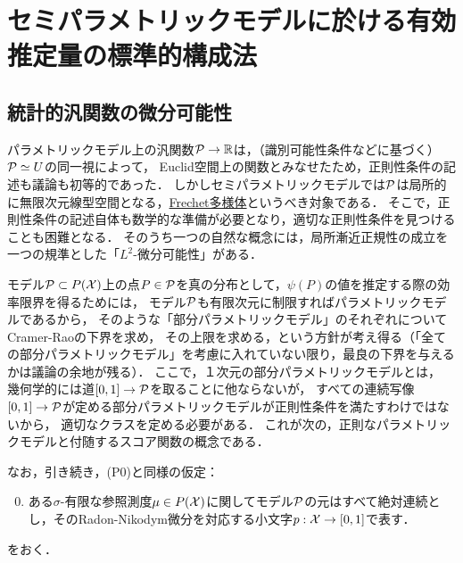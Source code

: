 \documentclass[uplatex, dvipdfmx]{jsarticle}
\begin{document}
\section{セミパラメトリックモデルに於ける有効推定量の標準的構成法}

\subsection{統計的汎関数の微分可能性}

\begin{tcolorbox}[colframe=ForestGreen, colback=ForestGreen!10!white,breakable,colbacktitle=ForestGreen!40!white,coltitle=black,fonttitle=\bfseries\sffamily,
title=]
    パラメトリックモデル上の汎関数$\P\to\R$は，（識別可能性条件などに基づく）$\P\simeq U$の同一視によって，
    Euclid空間上の関数とみなせたため，正則性条件の記述も議論も初等的であった．
    しかしセミパラメトリックモデルでは$\P$は局所的に無限次元線型空間となる，\href{https://ncatlab.org/nlab/show/Fr%C3%A9chet+manifold}{Frechet多様体}というべき対象である．
    そこで，正則性条件の記述自体も数学的な準備が必要となり，適切な正則性条件を見つけることも困難となる．
    そのうち一つの自然な概念には，局所漸近正規性の成立を一つの規準とした「$L^2$-微分可能性」がある．
\end{tcolorbox}

モデル$\P\subset P(\X)$上の点$P\in\P$を真の分布として，$\psi(P)$の値を推定する際の効率限界を得るためには，
モデル$\P$も有限次元に制限すればパラメトリックモデルであるから，
そのような「部分パラメトリックモデル」のそれぞれについてCramer-Raoの下界を求め，
その上限を求める，という方針が考え得る（「全ての部分パラメトリックモデル」を考慮に入れていない限り，最良の下界を与えるかは議論の余地が残る）．
ここで，１次元の部分パラメトリックモデルとは，
幾何学的には道$[0,1]\to\P$を取ることに他ならないが，
すべての連続写像$[0,1]\to\P$が定める部分パラメトリックモデルが正則性条件を満たすわけではないから，
適切なクラスを定める必要がある．
これが次の，正則なパラメトリックモデルと付随するスコア関数の概念である．

なお，引き続き，(P0)と同様の仮定：
\begin{enumerate}[({S}1)]\setcounter{enumi}{-1}
    \item ある$\sigma$-有限な参照測度$\mu\in P(\X)$に関してモデル$\P$の元はすべて絶対連続とし，そのRadon-Nikodym微分を対応する小文字$p:\X\to[0,1]$で表す．
\end{enumerate}
をおく．
\end{document}
